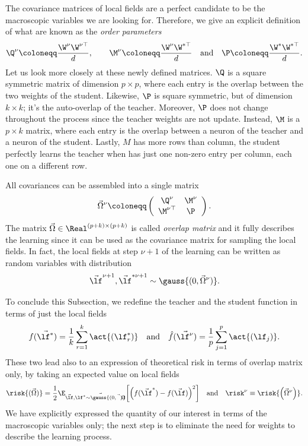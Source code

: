 The covariance matrices of local fields are a perfect candidate to be
the macroscopic variables we are looking for. Therefore, we give an explicit 
definition of what are known as the \emph{order parameters}
\begin{equation} \label{eq:order_parameters_definiton}
  \Q^\nu \coloneqq \frac{\W^\nu \W^{\nu\top}}{d}, \qquad
  \M^\nu \coloneqq \frac{\W^\nu \W^{*\top}}{d} \quad\text{and}\quad
  \P \coloneqq \frac{\W^* \W^{*\top}}{d}.
\end{equation}
Let us look more closely at these newly defined matrices. \(\Q\) is a square symmetric
matrix of dimension \(p\times p\), where each entry is the overlap between the two
weights of the student. Likewise, \(\P\) is square symmetric, but of dimension \(k\times k\);
it's the auto-overlap of the teacher. Moreover, \(\P\) does not change throughout
the process since the teacher weights are not update. Instead, \(\M\) is a \(p\times k\)
matrix, where each entry is the overlap between a neuron of the teacher and a neuron
of the student. Lastly, \(M\) has more rows than column, the student perfectly 
learns the teacher when has just one non-zero entry per column, each one on a different row.

All covariances can be assembled into a single matrix
\[
  \vec{\Omega}^\nu \coloneqq \left(\begin{array}{cc}
    \Q^\nu & \M^\nu \\
    \M^{\nu\top} & \P
  \end{array}\right).
\]
The matrix \(\vec{\Omega}\in\Real^{(p+k)\times(p+k)}\) is called \emph{overlap matrix} and it fully
describes the learning since it can be used as the covariance matrix for sampling the local fields.
In fact, the local fields at step \(\nu+1\) of the learning can be written as random variables with distribution
\[\vec{\lf}^{\nu+1},\vec{\lf}^{*\nu+1} \sim \gauss{(0,\vec{\Omega}^\nu)}.\]

To conclude this Subsection, we redefine the teacher and the student function
in terms of just the local fields
\[
  f{(\vec{\lf^*})} = \frac{1}{k}\sum_{r=1}^{k} \act{\left(\lf^*_r\right)}\quad\text{and}\quad
  \hat{f}{(\vec{\lf^{\nu}})} = \frac{1}{p}\sum_{j=1}^{p} \act{\left(\lf_j\right)}.
\]
These two lead also to an expression of theoretical risk in terms of overlap matrix only, 
by taking an expected value on local fields
\begin{equation}\label{eq:riskfunctionalOmega}
  \risk{(\vec{\Omega})} = \frac12\E_{\vec{\lf},\vec{\lf^* \sim \gauss{(0,\vec{\Omega})}}}
                              {\left[\left(f{(\vec{\lf}^*)} - f{(\vec{\lf})}\right)^2\right]}
  \quad\text{and}\quad\risk^\nu \equiv \risk{\left(\vec{\Omega}^\nu\right)}.
\end{equation}
We have explicitly expressed the quantity of our interest in terms of the macroscopic 
variables only; the next step is to eliminate the need for weights to describe the learning process.





